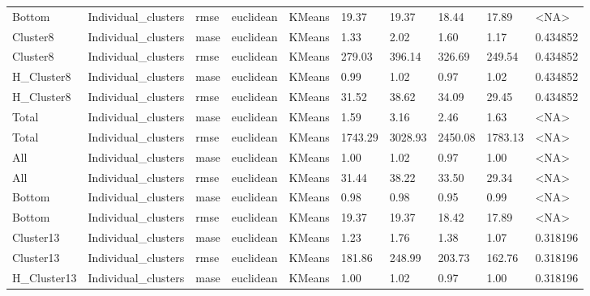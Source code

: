 \begin{tabular}{llllllllll}
     Bottom & Individual\_clusters &   rmse &  euclidean &        KMeans &   19.37 &    19.37 &                 18.44 &         17.89 &      <NA> \\
   Cluster8 & Individual\_clusters &   mase &  euclidean &        KMeans &    1.33 &     2.02 &                  1.60 &          1.17 &  0.434852 \\
   Cluster8 & Individual\_clusters &   rmse &  euclidean &        KMeans &  279.03 &   396.14 &                326.69 &        249.54 &  0.434852 \\
 H\_Cluster8 & Individual\_clusters &   mase &  euclidean &        KMeans &    0.99 &     1.02 &                  0.97 &          1.02 &  0.434852 \\
 H\_Cluster8 & Individual\_clusters &   rmse &  euclidean &        KMeans &   31.52 &    38.62 &                 34.09 &         29.45 &  0.434852 \\
      Total & Individual\_clusters &   mase &  euclidean &        KMeans &    1.59 &     3.16 &                  2.46 &          1.63 &      <NA> \\
      Total & Individual\_clusters &   rmse &  euclidean &        KMeans & 1743.29 &  3028.93 &               2450.08 &       1783.13 &      <NA> \\
        All & Individual\_clusters &   mase &  euclidean &        KMeans &    1.00 &     1.02 &                  0.97 &          1.00 &      <NA> \\
        All & Individual\_clusters &   rmse &  euclidean &        KMeans &   31.44 &    38.22 &                 33.50 &         29.34 &      <NA> \\
     Bottom & Individual\_clusters &   mase &  euclidean &        KMeans &    0.98 &     0.98 &                  0.95 &          0.99 &      <NA> \\
     Bottom & Individual\_clusters &   rmse &  euclidean &        KMeans &   19.37 &    19.37 &                 18.42 &         17.89 &      <NA> \\
  Cluster13 & Individual\_clusters &   mase &  euclidean &        KMeans &    1.23 &     1.76 &                  1.38 &          1.07 &  0.318196 \\
  Cluster13 & Individual\_clusters &   rmse &  euclidean &        KMeans &  181.86 &   248.99 &                203.73 &        162.76 &  0.318196 \\
H\_Cluster13 & Individual\_clusters &   mase &  euclidean &        KMeans &    1.00 &     1.02 &                  0.97 &          1.00 &  0.318196 \\

\end{tabular}
